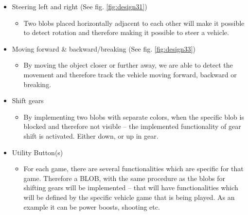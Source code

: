 \begin{itemize}
\item Steering left and right (See fig. \ref{fig:design31})
	\begin{itemize}
	\item Two blobs placed horizontally adjacent to each other will make it possible to detect rotation and therefore making it possible to steer a vehicle.
	\end{itemize}
	
\item Moving forward \& backward/breaking (See fig. \ref{fig:design33})
	\begin{itemize}
	\item By moving the object closer or further away, we are able to detect the movement and therefore track the vehicle moving forward, backward or breaking.
	\end{itemize}
	
\item Shift gears
	\begin{itemize}
	\item By implementing two blobs with separate colors, when the specific blob is blocked and therefore not visible – the implemented functionality of gear shift is activated. Either down, or up in gear.
	\end{itemize}
	
\item Utility Button(s)
	\begin{itemize}
	\item For each game, there are several functionalities which are specific for that game. Therefore a BLOB, with the same procedure as the blobs for shifting gears will be implemented – that will have functionalities which will be defined by the specific vehicle game that is being played. As an example it can be power boosts, shooting etc.
	\end{itemize}
\end{itemize}


